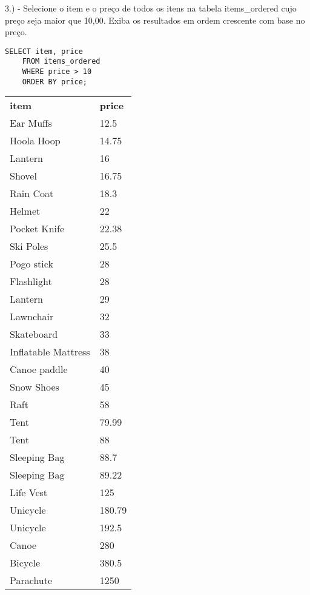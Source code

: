 3.) - Selecione o item e o preço de todos os itens na tabela items\_ordered cujo preço seja maior que 10,00. Exiba os resultados em ordem crescente com base no preço.

\begin{lstlisting}
SELECT item, price
	FROM items_ordered 
	WHERE price > 10 
	ORDER BY price;
\end{lstlisting}

\begin{tabular}{ll}
    {\textbf{item}}       & {\textbf{price}} \\
    {Ear Muffs}           & {12.5}           \\
    {Hoola Hoop}          & {14.75}          \\
    {Lantern}             & {16}             \\
    {Shovel}              & {16.75}          \\
    {Rain Coat}           & {18.3}           \\
    {Helmet}              & {22}             \\
    {Pocket Knife}        & {22.38}          \\
    {Ski Poles}           & {25.5}           \\
    {Pogo stick}          & {28}             \\
    {Flashlight}          & {28}             \\
    {Lantern}             & {29}             \\
    {Lawnchair}           & {32}             \\
    {Skateboard}          & {33}             \\
    {Inflatable Mattress} & {38}             \\
    {Canoe paddle}        & {40}             \\
    {Snow Shoes}          & {45}             \\
    {Raft}                & {58}             \\
    {Tent}                & {79.99}          \\
    {Tent}                & {88}             \\
    {Sleeping Bag}        & {88.7}           \\
    {Sleeping Bag}        & {89.22}          \\
    {Life Vest}           & {125}            \\
    {Unicycle}            & {180.79}         \\
    {Unicycle}            & {192.5}          \\
    {Canoe}               & {280}            \\
    {Bicycle}             & {380.5}          \\
    {Parachute}           & {1250}          
\end{tabular} \\ \\


